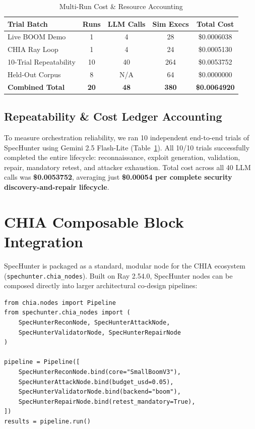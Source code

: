 \documentclass[conference,10pt]{IEEEtran}
\begin{document}
\begin{table}[t]
\centering
\caption{Multi-Run Cost \& Resource Accounting}
\label{tab:costs}
\begin{tabular}{lcccc}
\toprule
\textbf{Trial Batch} & \textbf{Runs} & \textbf{LLM Calls} & \textbf{Sim Execs} & \textbf{Total Cost} \\
\midrule
Live BOOM Demo & 1 & 4 & 28 & \$0.0006038 \\
CHIA Ray Loop & 1 & 4 & 24 & \$0.0005130 \\
10-Trial Repeatability & 10 & 40 & 264 & \$0.0053752 \\
Held-Out Corpus & 8 & N/A & 64 & \$0.0000000 \\
\midrule
\textbf{Combined Total} & \textbf{20} & \textbf{48} & \textbf{380} & \textbf{\$0.0064920} \\
\bottomrule
\end{tabular}
\end{table}

\subsection{Repeatability \& Cost Ledger Accounting}
To measure orchestration reliability, we ran 10 independent end-to-end trials of SpecHunter using Gemini 2.5 Flash-Lite (Table~\ref{tab:costs}). All 10/10 trials successfully completed the entire lifecycle: reconnaissance, exploit generation, validation, repair, mandatory retest, and attacker exhaustion. Total cost across all 40 LLM calls was \textbf{\$0.0053752}, averaging just \textbf{\$0.00054 per complete security discovery-and-repair lifecycle}.

\section{CHIA Composable Block Integration}
SpecHunter is packaged as a standard, modular node for the CHIA ecosystem (\texttt{spechunter.chia\_nodes}). Built on Ray 2.54.0, SpecHunter nodes can be composed directly into larger architectural co-design pipelines:
\begin{verbatim}
from chia.nodes import Pipeline
from spechunter.chia_nodes import (
    SpecHunterReconNode, SpecHunterAttackNode,
    SpecHunterValidatorNode, SpecHunterRepairNode
)

pipeline = Pipeline([
    SpecHunterReconNode.bind(core="SmallBoomV3"),
    SpecHunterAttackNode.bind(budget_usd=0.05),
    SpecHunterValidatorNode.bind(backend="boom"),
    SpecHunterRepairNode.bind(retest_mandatory=True),
])
results = pipeline.run()
\end{verbatim}
\end{document}
